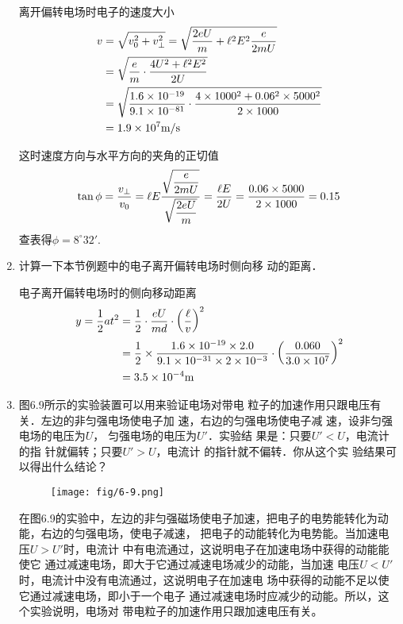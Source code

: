 \begin{enumerate}
\begin{solution}
    离开偏转电场时电子的速度大小
   \[\begin{split}
      v&=\sqrt{v^2_0+v^2_{\bot}}=\sqrt{\frac{2eU}{m}+\ell^2E^2\frac{e}{2mU}}\\
&=\sqrt{\frac{e}{m}\cdot \frac{4U^2+\ell^2E^2}{2U}}\\
&=\sqrt{\frac{1.6\times 10^{-19}}{9.1\times 10^{-81}}\cdot \frac{4\times 1000^2+0.06^2\times 5000^2}{2\times 1000}}\\
&=1.9\times 10^7\text{m}/\text{s}
   \end{split}\]

    这时速度方向与水平方向的夹角的正切值
    \[\tan\phi=\frac{v_{\bot}}{v_0}=\ell E\frac{\sqrt{\dfrac{e}{2mU}}}{\sqrt{\dfrac{2eU}{m}}}=\frac{\ell E}{2U}=\frac{0.06\times 5000}{2\times 1000}=0.15 \]
    查表得$\phi=8^{\circ}32'$.
\end{solution}

\item 计算一下本节例题中的电子离开偏转电场时侧向移
动的距离．

\begin{solution}
    电子离开偏转电场时的侧向移动距离
    \[\begin{split}
 y=\frac{1}{2}at^2 &=\frac{1}{2}\cdot \frac{eU}{md}\cdot \left(\frac{\ell }{v}\right)^2\\
 &=\frac{1}{2}\times \frac{1.6\times 10^{-19}\times 2.0}{9.1\times 10^{-31}\times 2\times 10^{-3}}\cdot \left(\frac{0.060}{3.0\times 10^7}\right)^2\\
 &=3.5\times 10^{-4}{\rm m}      
    \end{split}\]
\end{solution}

\item 图6.9所示的实验装置可以用来验证电场对带电
粒子的加速作用只跟电压有关．左边的非匀强电场使电子加
速，右边的匀强电场使电子减
速，设非匀强电场的电压为$U$，
匀强电场的电压为$U'$．实验结
果是：只要$U'<U$，电流计的指
针就偏转；只要$U'>U$，电流计
的指针就不偏转．你从这个实
验结果可以得出什么结论？
\begin{figure}[htp]\centering
	\texttt{[image: fig/6-9.png]}
	\caption{}
	\end{figure}

    \begin{solution}
        在图6.9的实验中，左边的非匀强磁场使电子加速，把电子的电势能转化为动能，右边的匀强电场，使电子减速，
        把电子的动能转化为电势能。当加速电压$U>U'$时，电流计
        中有电流通过，这说明电子在加速电场中获得的动能能使它
        通过减速电场，即大于它通过减速电场减少的动能，当加速
        电压$U<U'$时，电流计中没有电流通过，这说明电子在加速电
        场中获得的动能不足以使它通过减速电场，即小于一个电子
        通过减速电场时应减少的动能。所以，这个实验说明，电场对
        带电粒子的加速作用只跟加速电压有关。
    \end{solution}
    
\end{enumerate}



